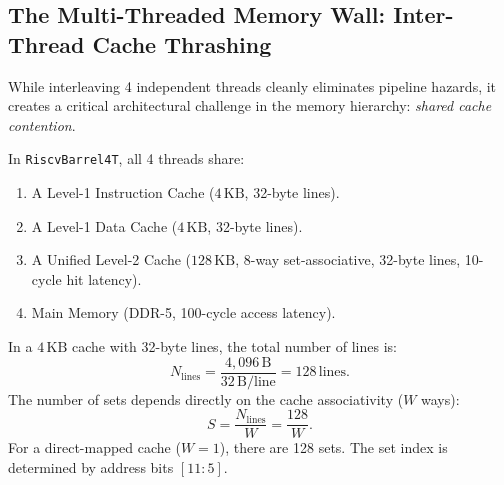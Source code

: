 \subsection{The Multi-Threaded Memory Wall: Inter-Thread Cache Thrashing}\label{subsec:mt_memory_wall}

While interleaving 4 independent threads cleanly eliminates pipeline hazards, it creates a critical architectural challenge in the memory hierarchy: \textit{shared cache contention}.

In \texttt{RiscvBarrel4T}, all 4 threads share:
\begin{enumerate}
    \item A Level-1 Instruction Cache ($4\,\text{KB}$, 32-byte lines).
    \item A Level-1 Data Cache ($4\,\text{KB}$, 32-byte lines).
    \item A Unified Level-2 Cache ($128\,\text{KB}$, 8-way set-associative, 32-byte lines, 10-cycle hit latency).
    \item Main Memory (DDR-5, 100-cycle access latency).
\end{enumerate}

In a $4\,\text{KB}$ cache with 32-byte lines, the total number of lines is:
\begin{equation}
N_{\text{lines}} = \frac{4,096\,\text{B}}{32\,\text{B/line}} = 128\,\text{lines}.
\end{equation}
The number of sets depends directly on the cache associativity ($W$ ways):
\begin{equation}
S = \frac{N_{\text{lines}}}{W} = \frac{128}{W}.
\end{equation}
For a direct-mapped cache ($W = 1$), there are 128 sets. The set index is determined by address bits $[11:5]$.

